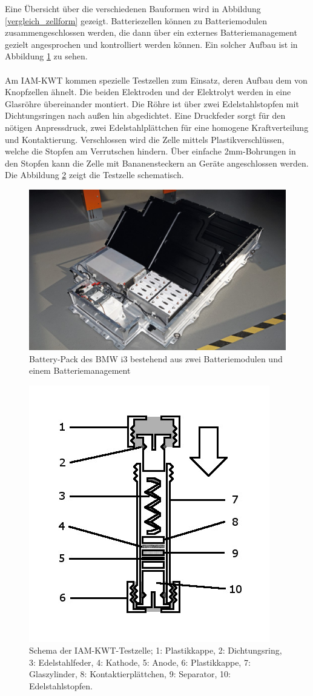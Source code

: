 \documentclass[a4paper, 11pt, headsepline,footsepline,twoside,abstract]{scrbook}
\begin{document}
Eine Übersicht über die verschiedenen Bauformen wird in Abbildung \ref{vergleich_zellform} gezeigt. Batteriezellen können zu Batteriemodulen zusammengeschlossen werden, die dann über ein externes Batteriemanagement gezielt angesprochen und kontrolliert werden können. Ein solcher Aufbau ist in Abbildung \ref{battery_pack} zu sehen.
\\\\
Am IAM-KWT kommen spezielle Testzellen zum Einsatz, deren Aufbau dem von Knopfzellen ähnelt. Die beiden Elektroden und der Elektrolyt werden in eine Glasröhre übereinander montiert. Die Röhre ist über zwei Edelstahlstopfen mit Dichtungsringen nach außen hin abgedichtet. Eine Druckfeder sorgt für den nötigen Anpressdruck, zwei Edelstahlplättchen für eine homogene Kraftverteilung und Kontaktierung. Verschlossen wird die Zelle mittels Plastikverschlüssen, welche die Stopfen am Verrutschen hindern. Über einfache 2mm-Bohrungen in den Stopfen kann die Zelle mit Bananensteckern an Geräte angeschlossen werden. Die Abbildung \ref{schema_zelle} zeigt die Testzelle schematisch.
\begin{figure}
	\centering
	\includegraphics[width=0.9\columnwidth]{images/bmw-i3-battery-pack.png}
	\caption{Battery-Pack des BMW i3 bestehend aus zwei Batteriemodulen und einem Batteriemanagement \cite{bmwblog}}
	\label{battery_pack}
\end{figure}
\begin{figure}
	\centering
	\includegraphics[width=0.55\columnwidth]{images/Schema_Zelle.jpg}
	\caption{Schema der IAM-KWT-Testzelle; 
			1: Plastikkappe,
			2: Dichtungsring,
			3: Edelstahlfeder,
			4: Kathode,
			5: Anode,
			6: Plastikkappe,
			7: Glaszylinder,
			8: Kontaktierplättchen,
			9: Separator,
			10: Edelstahlstopfen.
			}
	\label{schema_zelle}
\end{figure}
\end{document}

